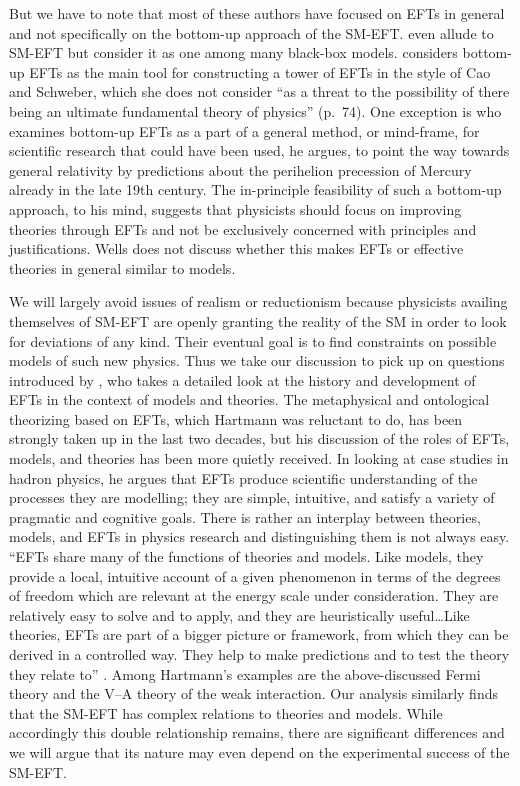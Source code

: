 But we have to note that most of these authors have focused on EFTs in general and not specifically on the bottom-up approach of the SM-EFT.
\citet[p.~3]{Rivat2020-RIVPFO} even allude to SM-EFT but consider it as one among many black-box models. 
\citet[p.~72]{Crowther2016-CROESU} considers bottom-up EFTs as the main tool for constructing a tower of EFTs in the style of Cao and Schweber, which she does not consider ``as a threat to the possibility of there being an ultimate fundamental theory of physics'' (p.~74).  
One exception is \citet{wells2011} who examines bottom-up EFTs as a part of a general method, or mind-frame, for scientific research that could have been used, he argues, to point the way towards general relativity by predictions about the perihelion precession of Mercury already in the late 19th century. 
The in-principle feasibility of such a bottom-up approach, to his mind, suggests that physicists should focus on improving theories through EFTs and not be exclusively concerned with principles and justifications.
Wells does not discuss whether this makes EFTs or effective theories in general similar to models.

We will largely avoid issues of realism or reductionism because physicists availing themselves of SM-EFT are openly granting the reality of the SM in order to look for deviations of any kind.
Their eventual goal is to find constraints on possible models of such new physics. 
Thus we take our discussion to pick up on questions introduced by \citet{hartmann2001}, who takes a detailed look at the history and development of EFTs in the context of models and theories.
The metaphysical and ontological theorizing based on EFTs, which Hartmann was reluctant to do, has been strongly taken up in the last two decades, but his discussion of the roles of EFTs, models, and theories has been more quietly received.
In looking at case studies in hadron physics, he argues that EFTs produce scientific understanding of the processes they are modelling; they are simple, intuitive, and satisfy a variety of pragmatic and cognitive goals. 
There is rather an interplay between theories, models, and EFTs in physics research and distinguishing them is not always easy. 
``EFTs share many of the functions of theories and models. Like models, they provide a local, intuitive account of a given phenomenon in terms of the degrees of freedom which are relevant at the energy scale under consideration. They are relatively easy to solve and to apply, and they are heuristically useful\ldots Like theories, EFTs are part of a bigger picture or framework, from which they can be derived in a controlled way. They help to make predictions and to test the theory they relate to'' \citeyear[p.~294]{hartmann2001}. 
Among Hartmann's examples are the above-discussed Fermi theory and the V--A theory of the weak interaction. 
Our analysis similarly finds that the SM-EFT has complex relations to theories and models. 
While accordingly this double relationship remains, there are significant differences and we will argue that its nature may even depend on the experimental success of the SM-EFT.


